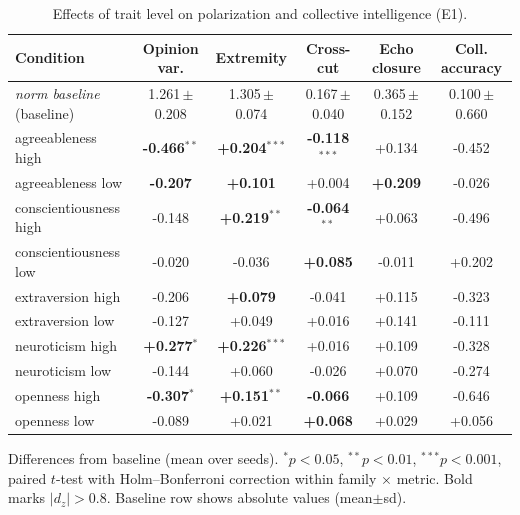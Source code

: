 \begin{table}[t]\centering
\scriptsize\setlength{\tabcolsep}{1.5pt}
\caption{Effects of trait level on polarization and collective intelligence (E1).}
\label{tab:e1}
\begin{tabular}{@{}lccccc@{}}
\toprule
Condition & Opinion var. & Extremity & Cross-cut & Echo closure & Coll. accuracy \\
\midrule
\textit{norm baseline} (baseline) & 1.261\,{\scriptsize$\pm$0.208} & 1.305\,{\scriptsize$\pm$0.074} & 0.167\,{\scriptsize$\pm$0.040} & 0.365\,{\scriptsize$\pm$0.152} & 0.100\,{\scriptsize$\pm$0.660} \\
\midrule
agreeableness high & \textbf{-0.466$^{**}$} & \textbf{+0.204$^{***}$} & \textbf{-0.118$^{***}$} & +0.134 & -0.452 \\
agreeableness low & \textbf{-0.207} & \textbf{+0.101} & +0.004 & \textbf{+0.209} & -0.026 \\
conscientiousness high & -0.148 & \textbf{+0.219$^{**}$} & \textbf{-0.064$^{**}$} & +0.063 & -0.496 \\
conscientiousness low & -0.020 & -0.036 & \textbf{+0.085} & -0.011 & +0.202 \\
extraversion high & -0.206 & \textbf{+0.079} & -0.041 & +0.115 & -0.323 \\
extraversion low & -0.127 & +0.049 & +0.016 & +0.141 & -0.111 \\
neuroticism high & \textbf{+0.277$^{*}$} & \textbf{+0.226$^{***}$} & +0.016 & +0.109 & -0.328 \\
neuroticism low & -0.144 & +0.060 & -0.026 & +0.070 & -0.274 \\
openness high & \textbf{-0.307$^{*}$} & \textbf{+0.151$^{**}$} & \textbf{-0.066} & +0.109 & -0.646 \\
openness low & -0.089 & +0.021 & \textbf{+0.068} & +0.029 & +0.056 \\
\bottomrule
\end{tabular}
\par\smallskip\footnotesize Differences from baseline (mean over seeds). $^{*}p<0.05$, $^{**}p<0.01$, $^{***}p<0.001$, paired $t$-test with Holm--Bonferroni correction within family $\times$ metric. Bold marks $|d_z|>0.8$. Baseline row shows absolute values (mean$\pm$sd).
\end{table}
